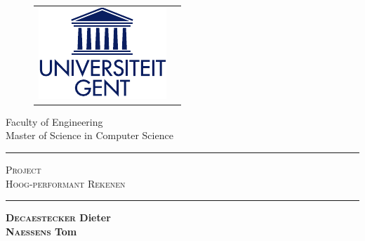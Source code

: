 \begin{titlepage}

\fontsize{12pt}{14pt}
\selectfont

\begin{center}

\begin{figure}[htb]
\centering
\renewcommand{\tabcolsep}{5pt}
\renewcommand{\arraystretch}{0}
  \begin{tabular}{@{}cc@{}}
    \includegraphics[width=.3\textwidth]{includes/UGent}
  \end{tabular}
\end{figure}

\vspace{0.5cm}

Faculty of Engineering\\
Master of Science in Computer Science\\

\vspace{3.5cm}

\fontsize{17.28pt}{21pt}
\selectfont

\hrule
\vspace{10pt}
\textsc{Project \\ Hoog-performant Rekenen}\\
\vspace{10pt}
\hrule

\vspace{25pt}

\fontsize{12pt}{14pt}
\selectfont

\vspace{10cm}

\fontsize{12pt}{14pt}
\selectfont

\hspace{0.5cm}
\textbf{ 
	\hfill\textsc{Decaestecker} Dieter\\
	\hfill\textsc{Naessens} Tom\\
}
\end{center}
\end{titlepage}